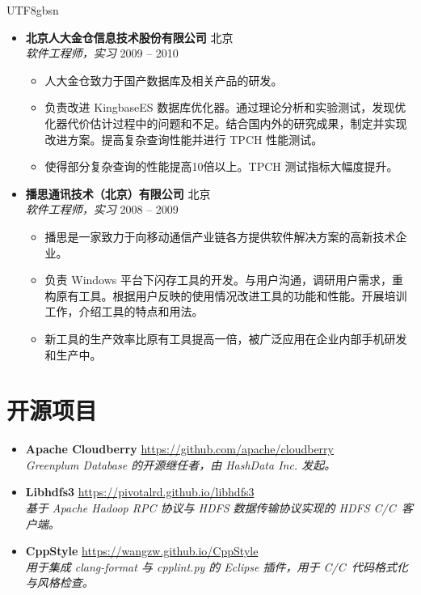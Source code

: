 \documentclass[10pt,a4paper]{article}
\newcommand{\entry}[4]{%
	\textbf{#1} \hfill {\color{subtle}#2}\\
	{\textit{#3}} \hfill {\color{subtle}\small #4}
}
\newcommand{\CPP}{C\nolinebreak[4]\hspace{-.05em}\raisebox{.22ex}{\footnotesize\bf ++}}
\begin{document}
\begin{CJK}{UTF8}{gbsn}
\begin{itemize}
	\item
	\entry{北京人大金仓信息技术股份有限公司}{北京}
		{软件工程师，实习}{2009 -- 2010}
	\begin{itemize}
		\item 人大金仓致力于国产数据库及相关产品的研发。
		\item 负责改进 KingbaseES 数据库优化器。通过理论分析和实验测试，发现优化器代价估计过程中的问题和不足。结合国内外的研究成果，制定并实现改进方案。提高复杂查询性能并进行 TPCH 性能测试。
		\item 使得部分复杂查询的性能提高10倍以上。TPCH 测试指标大幅度提升。
	\end{itemize}

	\item
	\entry{播思通讯技术（北京）有限公司}{北京}
		{软件工程师，实习}{2008 -- 2009}
	\begin{itemize}
		\item 播思是一家致力于向移动通信产业链各方提供软件解决方案的高新技术企业。
		\item 负责 Windows 平台下闪存工具的开发。与用户沟通，调研用户需求，重构原有工具。根据用户反映的使用情况改进工具的功能和性能。开展培训工作，介绍工具的特点和用法。
		\item 新工具的生产效率比原有工具提高一倍，被广泛应用在企业内部手机研发和生产中。
	\end{itemize}
\end{itemize}

\section*{开源项目}

\begin{itemize}
	\item
	\textbf{Apache Cloudberry} \hfill {\color{subtle}\href{https://github.com/apache/cloudberry}{https://github.com/apache/cloudberry}}\\
	\textit{Greenplum Database 的开源继任者，由 HashData Inc. 发起。}

	\item
	\textbf{Libhdfs3} \hfill {\color{subtle}\href{https://pivotalrd.github.io/libhdfs3}{https://pivotalrd.github.io/libhdfs3}}\\
	\textit{基于 Apache Hadoop RPC 协议与 HDFS 数据传输协议实现的 HDFS C/\CPP\ 客户端。}

	\item
	\textbf{CppStyle} \hfill {\color{subtle}\href{https://wangzw.github.io/CppStyle}{https://wangzw.github.io/CppStyle}}\\
	\textit{用于集成 clang-format 与 cpplint.py 的 Eclipse 插件，用于 C/\CPP\ 代码格式化与风格检查。}
\end{itemize}


\end{CJK}
\end{document}
